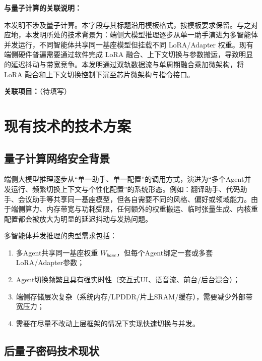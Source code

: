 \documentclass[12pt,a4paper]{article}
\begin{document}
\textbf{与量子计算的关联说明：}

本发明不涉及量子计算。本字段与其标题沿用模板格式，按模板要求保留。与之对应地，本发明所处的技术背景为：端侧大模型推理逐步从单一助手演进为多智能体并发运行，不同智能体共享同一基座模型但挂载不同 LoRA/Adapter 权重。现有端侧硬件普遍需要通过软件完成 LoRA 融合、上下文切换与参数搬运，导致明显的延迟抖动与带宽竞争。本发明通过双轨数据流与单周期融合乘加微架构，将 LoRA 融合和上下文切换控制下沉至芯片微架构与指令接口。

\textbf{关联项目：}\underline{\hspace{8cm}}（待填写）

\section{现有技术的技术方案}

\subsection{量子计算网络安全背景}

端侧大模型推理逐步从“单一助手、单一配置”的调用方式，演进为“多个Agent并发运行、频繁切换上下文与个性化配置”的系统形态。例如：翻译助手、代码助手、会议助手等共享同一基座模型，但各自需要不同的风格、偏好或领域能力。由于端侧算力、内存带宽与功耗受限，任何额外的权重搬运、临时张量生成、内核重配置都会被放大为明显的延迟抖动与发热问题。

多智能体并发推理的典型需求包括：
\begin{enumerate}
    \item 多Agent共享同一基座权重 $W_{base}$，但每个Agent绑定一套或多套LoRA/Adapter参数；
    \item Agent切换频繁且具有强实时性（交互式UI、语音流、前台/后台混合）；
    \item 端侧存储层次复杂（系统内存/LPDDR/片上SRAM/缓存），需要减少外部带宽压力；
    \item 需要在尽量不改动上层框架的情况下实现快速切换与并发。
\end{enumerate}

\subsection{后量子密码技术现状}
\end{document}
